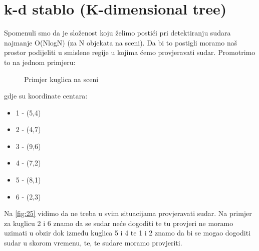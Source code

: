 \section{k-d stablo (K-dimensional tree)}
Spomenuli smo da je složenost koju želimo postići pri detektiranju sudara najmanje O(NlogN) (za N objekata na sceni). Da bi to postigli moramo naš prostor podijeliti u smislene regije u kojima ćemo provjeravati sudar. Promotrimo to na jednom primjeru:
\begin{figure}[!http]	
	\begin{center}
	\end{center}
	\caption{Primjer kuglica na sceni}
	\label{fig:26}
\end{figure}\newline
gdje su koordinate centara:\newpage
\begin{itemize}
	\item 1 - (5,4)
	\item 2 - (4,7)
	\item 3 - (9,6)
	\item 4 - (7,2)
	\item 5 - (8,1)
	\item 6 - (2,3)
\end{itemize}
Na \ref{fig:25} vidimo da ne treba u svim situacijama provjeravati sudar. Na primjer za kuglicu 2 i 6 znamo da se sudar neće dogoditi te tu provjeri ne moramo uzimati u obzir dok između kuglica 5 i 4 te 1 i 2 znamo da bi se mogao dogoditi sudar u skorom vremenu, te, te sudare moramo provjeriti.

